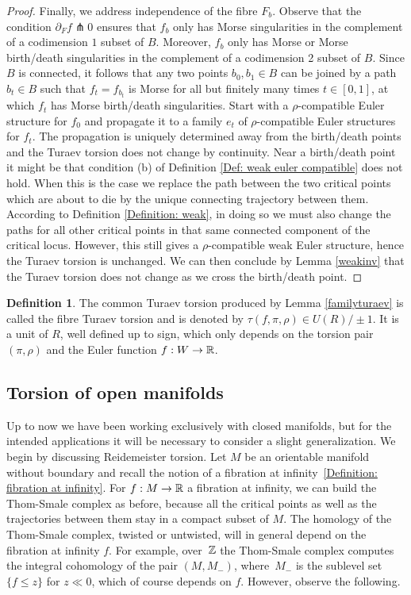 \documentclass[11pt]{article}
\numberwithin{equation}{section}\providecommand{\dpl}{\displaystyle}
\theoremstyle{plain}
\theoremstyle{definition}
\newtheorem{definition}[theorem]{Definition}
\begin{document}
\begin{proof}
Finally, we address independence of the fibre $F_b$. Observe that the condition \hbox{$\partial_F f \pitchfork 0$} ensures that $f_b$ only has Morse singularities in the complement of a codimension $1$ subset of $B$. Moreover, $f_b$ only has Morse or Morse birth/death singularities in the complement of a codimension 2 subset of $B$. Since $B$ is connected, it follows that any two points $b_0, b_1 \in B$ can be joined by a path $b_t \in B$ such that $f_t=f_{b_t}$ is Morse for all but finitely many times $t\in [0,1]$, at which $f_t$ has Morse birth/death singularities. Start with a $\rho$-compatible Euler structure for $f_0$ and propagate it to a family $e_t$ of $\rho$-compatible Euler structures for $f_t$. The propagation is uniquely determined away from the birth/death points and the Turaev torsion does not change by continuity. Near a birth/death point it might be that condition (b) of Definition \ref{Def: weak euler compatible} does not hold. When this is the case we replace the path between the two critical points which are about to die by the unique connecting trajectory between them. According to Definition \ref{Definition: weak}, in doing so we must also change the paths for all other critical points in that same connected component of the critical locus. However, this still gives a $\rho$-compatible weak Euler structure, hence the Turaev torsion is unchanged. We can then conclude by Lemma \ref{weakinv} that the Turaev torsion does not change as we cross the birth/death point. \end{proof}

\begin{definition}
The common Turaev torsion produced by Lemma \ref{familyturaev} is called the fibre Turaev torsion and is denoted by $\tau(f,\pi, \rho) \in U(R) / \pm 1$. It is a unit of $R$, well defined up to sign, which only depends on the torsion pair $(\pi, \rho)$ and the Euler function $f:W \to \mathbb{R}$.
\end{definition}

\subsection{Torsion of open manifolds}

Up to now we have been working exclusively with closed manifolds, but for the intended applications it will be necessary to consider a slight generalization. We begin by discussing Reidemeister torsion. Let $M$ be an orientable manifold without boundary and recall the notion of a fibration at infinity~\ref{Definition: fibration at infinity}. For $f:M \to \mathbb{R}$ a fibration at infinity, we can build the Thom-Smale complex as before, because all the critical points as well as the trajectories between them stay in a compact subset of $M$. The homology of the Thom-Smale complex, twisted or untwisted, will in general depend on the fibration at infinity $f$. For example, over~$\mathbb{Z}$ the Thom-Smale complex computes the integral cohomology of the pair $(M,M_{-})$, where~$M_{-}$ is the sublevel set $\{ f \leq z \}$ for $z\ll0$, which of course depends on $f$. However, observe the following.
\end{document}
